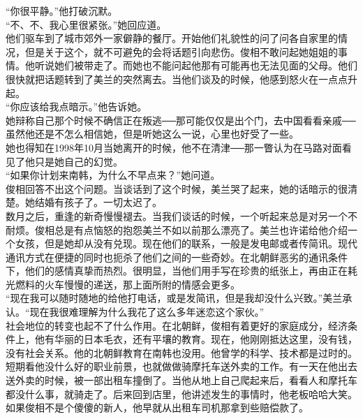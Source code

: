 “你很平静。”他打破沉默。\\

“不、不、我心里很紧张。”她回应道。\\

他们驱车到了城市郊外一家僻静的餐厅。开始他们礼貌性的问了问各自家里的情况，但是关于这个，就不可避免的会将话题引向悲伤。俊相不敢问起她姐姐的事情。他听说她们被带走了。而她也不能问起他那有可能再也无法见面的父母。他们很快就把话题转到了美兰的突然离去。当他们谈及的时候，他感到怒火在一点点升起。\\

“你应该给我点暗示。”他告诉她。\\

她辩称自己那个时候不确信正在叛逃──那可能仅仅是出个门，去中国看看亲戚──虽然他还是不怎么相信她，但是听她这么一说，心里也好受了一些。\\

她也得知在1998年10月当她离开的时候，他不在清津──那一瞥认为在马路对面看见了他只是她自己的幻觉。\\

“如果你计划来南韩，为什么不早点来？”她问道。\\

俊相回答不出这个问题。当谈话到了这个时候，美兰哭了起来，她的话暗示的很清楚。她结婚有孩子了。一切太迟了。\\

数月之后，重逢的新奇慢慢褪去。当我们谈话的时候，一个听起来总是对另一个不耐烦。俊相总是有点恼怒的抱怨美兰不如以前那么漂亮了。美兰也许诺给他介绍一个女孩，但是她却从没有兑现。现在他们的联系，一般是发电邮或者传简讯。现代通讯方式在便捷的同时也扼杀了他们之间的一些奇妙。在北朝鲜恶劣的通讯条件下，他们的感情真挚而热烈。很明显，当他们用手写在珍贵的纸张上，再由正在耗光燃料的火车慢慢的递送，那上面所附的情感会更多。\\

“现在我可以随时随地的给他打电话，或是发简讯，但是我却没什么兴致。”美兰承认。“现在我很难理解为什么我花了这么多年迷恋这个家伙。”\\

社会地位的转变也起不了什么作用。在北朝鲜，俊相有着更好的家庭成分，经济条件上，他有华丽的日本毛衣，还有平壤的教育。现在，他刚刚抵达这里，没有钱，没有社会关系。他的北朝鲜教育在南韩也没用。他曾学的科学、技术都是过时的。短期看他没什么好的职业前景，也就做做骑摩托车送外卖的工作。有一天在他出去送外卖的时候，被一部出租车撞倒了。当他从地上自己爬起来后，看看人和摩托车都没什么事，就骑走了。后来回到店里，他讲述发生的事情时，他老板哈哈大笑。如果俊相不是个傻傻的新人，他早就从出租车司机那拿到些赔偿款了。\\

